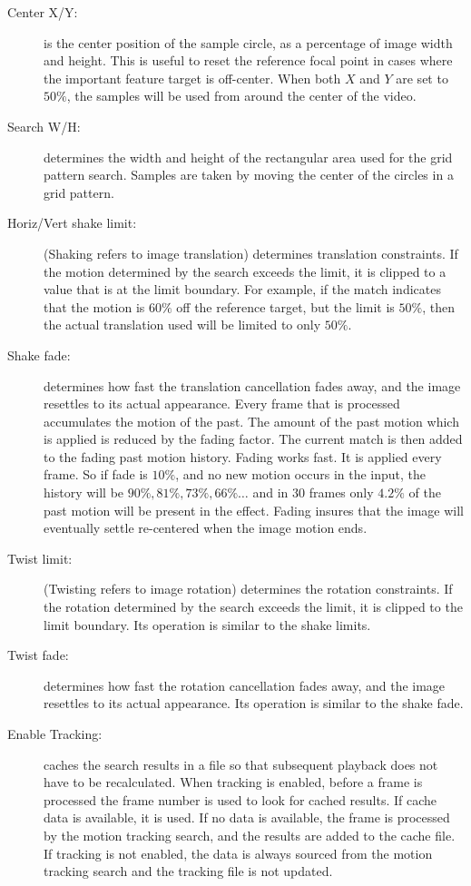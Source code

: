 \begin{description}
    \item[Center X/Y:] is the center position of the sample circle, as a percentage of image width and height.
    This is useful to reset the reference focal point in cases where the important feature target is off-center.
    When both $X$ and $Y$ are set to $50\%$, the samples will be used from around the center of the video.
    \item[Search W/H:] determines the width and height of the rectangular area used for the grid pattern search. Samples are taken by moving the center of the circles in a grid pattern.
    \item[Horiz/Vert shake limit:] (Shaking refers to image translation) determines translation constraints. If the motion determined by the search exceeds the limit, it is clipped to a value that is at the limit boundary. For example, if the match indicates that the motion is $60\%$ off the reference target, but the limit is $50\%$, then the actual translation used will be limited to only $50\%$.
    \item[Shake fade:] determines how fast the translation cancellation fades away, and the image resettles to its actual appearance. Every frame that is processed accumulates the motion of the past. The amount of the past motion which is applied is reduced by the fading factor. The current match is then added to the fading past motion history. Fading works fast. It is applied every frame. So if fade is $10\%$, and no new motion occurs in the input, the history will be $90\%, 81\%, 73\%, 66\%\dots$ and in $30$ frames only $4.2\%$ of the past motion will be present in the effect. Fading insures that the image will eventually settle re-centered when the image motion ends.
    \item[Twist limit:] (Twisting refers to image rotation) determines the rotation constraints. If the rotation determined by the search exceeds the limit, it is clipped to the limit boundary. Its operation is similar to the shake limits.
    \item[Twist fade:] determines how fast the rotation cancellation fades away, and the image resettles to its actual appearance. Its operation is similar to the shake fade.
    \item[Enable Tracking:] caches the search results in a file so that subsequent playback does not have to be recalculated. When tracking is enabled, before a frame is processed the frame number is used to look for cached results. If cache data is available, it is used. If no data is available, the frame is processed by the motion tracking search, and the results are added to the cache file. If tracking is not enabled, the data is always sourced from the motion tracking search and the tracking file is not updated.

\end{description}
